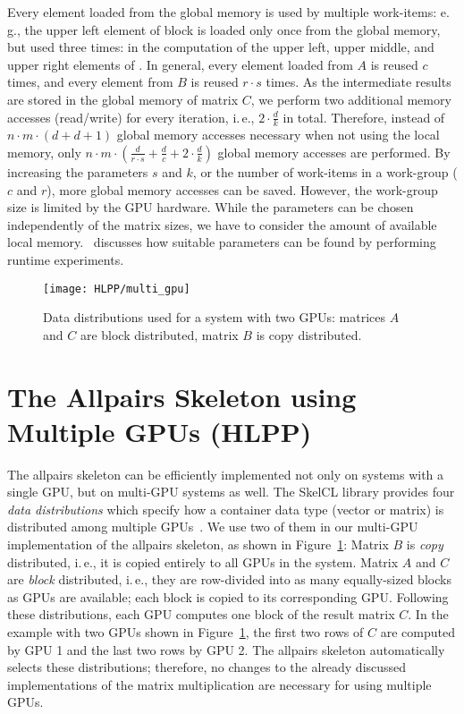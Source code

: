 Every element loaded from the global memory is used by multiple work-items:
e.\,g., the upper left element of block  is loaded only once from the global memory, but used three times:
in the computation of the upper left, upper middle, and upper right elements of .
In general, every element loaded from $A$ is reused $c$ times, and every element from $B$ is reused $r\cdot s$ times.
As the intermediate results are stored in the global memory of matrix $C$, we perform two additional memory accesses (read/write) for every iteration, i.\,e., $2\cdot \frac{d}{k}$ in total.
Therefore, instead of $n\cdot m\cdot (d + d + 1)$ global memory accesses necessary when not using the local memory, only $n\cdot m\cdot (\frac{d}{r\cdot s} + \frac{d}{c} + 2\cdot \frac{d}{k})$ global memory accesses are performed.
By increasing the parameters $s$ and $k$, or the number of work-items in a work-group ($c$ and $r$), more global memory accesses can be saved.
However, the work-group size is limited by the GPU hardware.
While the parameters can be chosen independently of the matrix sizes, we have to consider the amount of available local memory.
\cite{SaA-13}~discusses how suitable parameters can be found by performing runtime experiments.

\begin{figure}[b]
  \centering
  \texttt{[image: HLPP/multi\_gpu]}
  \caption{Data distributions used for a system with two GPUs: matrices $A$ and $C$ are block distributed, matrix $B$ is copy distributed.}
  \label{fig:multi_gpu}
\end{figure}

\section{The Allpairs Skeleton using Multiple GPUs (HLPP)}
\label{sec:multi_gpu}
The allpairs skeleton can be efficiently implemented not only on systems with a single GPU, but on multi-GPU systems as well.
The SkelCL library provides four \emph{data distributions} which specify how a container data type (vector or matrix) is distributed among multiple GPUs~\cite{StKG-12}.
We use two of them in our multi-GPU implementation of the allpairs skeleton, as shown in Figure~\ref{fig:multi_gpu}:
Matrix $B$ is \emph{copy} distributed, i.\,e., it is copied entirely to all GPUs in the system.
Matrix $A$ and $C$ are \emph{block} distributed, i.\,e., they are row-divided into as many equally-sized blocks as GPUs are available;
each block is copied to its corresponding GPU.
Following these distributions, each GPU computes one block of the result matrix $C$.
In the example with two GPUs shown in Figure~\ref{fig:multi_gpu}, the first two rows of $C$ are computed by GPU 1 and the last two rows by GPU 2.
The allpairs skeleton automatically selects these distributions; therefore, no changes to the already discussed implementations of the matrix multiplication are necessary for using multiple GPUs.




